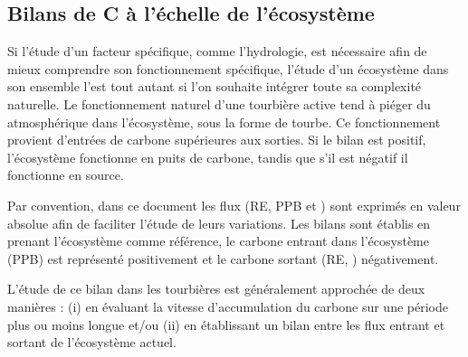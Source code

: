 \subsection{Bilans de C à l'échelle de l'écosystème}

Si l'étude d'un facteur spécifique, comme l'hydrologie, est nécessaire afin de mieux comprendre son fonctionnement spécifique, l'étude d'un écosystème dans son ensemble l'est tout autant si l'on souhaite intégrer toute sa complexité naturelle.
Le fonctionnement naturel d'une tourbière active tend à piéger du \coo atmosphérique dans l'écosystème, sous la forme de tourbe.
Ce fonctionnement provient d'entrées de carbone supérieures aux sorties.
Si le bilan est positif, l'écosystème fonctionne en puits de carbone, tandis que s'il est négatif il fonctionne en source.

Par convention, dans ce document les flux (RE, PPB et \fchh) sont exprimés en valeur absolue afin de faciliter l'étude de leurs variations.
Les bilans sont établis en prenant l'écosystème comme référence, le carbone entrant dans l'écosystème (PPB) est représenté positivement et le carbone sortant (RE, \fchh) négativement.

L'étude de ce bilan dans les tourbières est généralement approchée de deux manières : (i) en évaluant la vitesse d'accumulation du carbone sur une période plus ou moins longue et/ou (ii) en établissant un bilan entre les flux entrant et sortant de l'écosystème actuel.



